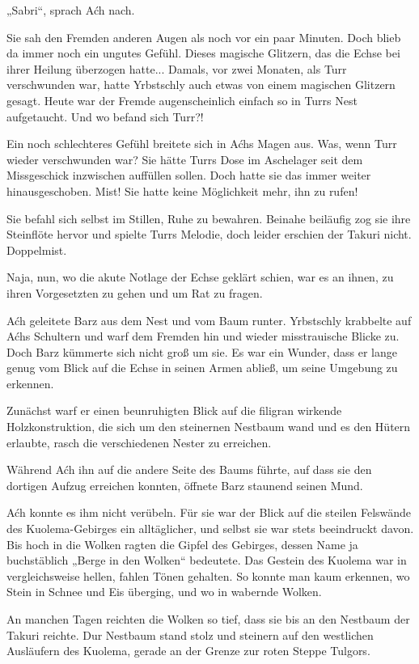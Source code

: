 „Sabri“, sprach Aćh nach.

Sie sah den Fremden anderen Augen als noch vor ein paar Minuten. Doch blieb da immer noch ein ungutes Gefühl. Dieses magische Glitzern, das die Echse bei ihrer Heilung überzogen hatte... Damals, vor zwei Monaten, als Turr verschwunden war, hatte Yrbstschly auch etwas von einem magischen Glitzern gesagt. Heute war der Fremde augenscheinlich einfach so in Turrs Nest aufgetaucht. Und wo befand sich Turr?!

Ein noch schlechteres Gefühl breitete sich in Aćhs Magen aus. Was, wenn Turr wieder verschwunden war? Sie hätte Turrs Dose im Aschelager seit dem Missgeschick inzwischen auffüllen sollen. Doch hatte sie das immer weiter hinausgeschoben. Mist! Sie hatte keine Möglichkeit mehr, ihn zu rufen!

Sie befahl sich selbst im Stillen, Ruhe zu bewahren. Beinahe beiläufig zog sie ihre Steinflöte hervor und spielte Turrs Melodie, doch leider erschien der Takuri nicht. Doppelmist.

Naja, nun, wo die akute Notlage der Echse geklärt schien, war es an ihnen, zu ihren Vorgesetzten zu gehen und um Rat zu fragen.

Aćh geleitete Barz aus dem Nest und vom Baum runter. Yrbstschly krabbelte auf Aćhs Schultern und warf dem Fremden hin und wieder misstrauische Blicke zu. Doch Barz kümmerte sich nicht groß um sie. Es war ein Wunder, dass er lange genug vom Blick auf die Echse in seinen Armen abließ, um seine Umgebung zu erkennen.

Zunächst warf er einen beunruhigten Blick auf die filigran wirkende Holzkonstruktion, die sich um den steinernen Nestbaum wand und es den Hütern erlaubte, rasch die verschiedenen Nester zu erreichen.

Während Aćh ihn auf die andere Seite des Baums führte, auf dass sie den dortigen Aufzug erreichen konnten, öffnete Barz staunend seinen Mund.

Aćh konnte es ihm nicht verübeln. Für sie war der Blick auf die steilen Felswände des Kuolema-Gebirges ein alltäglicher, und selbst sie war stets beeindruckt davon. Bis hoch in die Wolken ragten die Gipfel des Gebirges, dessen Name ja buchstäblich „Berge in den Wolken“ bedeutete. Das Gestein des Kuolema war in vergleichsweise hellen, fahlen Tönen gehalten. So konnte man kaum erkennen, wo Stein in Schnee und Eis überging, und wo in wabernde Wolken.

An manchen Tagen reichten die Wolken so tief, dass sie bis an den Nestbaum der Takuri reichte. Dur Nestbaum stand stolz und steinern auf den westlichen Ausläufern des Kuolema, gerade an der Grenze zur roten Steppe Tulgors.

